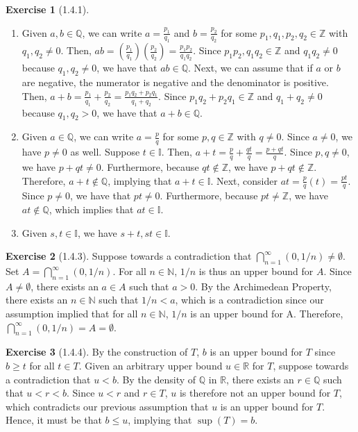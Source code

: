 \documentclass{amsart}
\theoremstyle{definition}
\newtheorem{exercise}{Exercise}
\newcommand{\N}{\mathbb{N}}
\newcommand{\Z}{\mathbb{Z}}
\newcommand{\Q}{\mathbb{Q}}
\newcommand{\I}{\mathbb{I}}
\newcommand{\R}{\mathbb{R}}
\begin{document}
\begin{exercise}[1.4.1]
  \begin{enumerate}[label={(\alph*)}]
    \item Given $a, b \in \Q$, we can write $a = \frac{p_1}{q_1}$ and $b =
      \frac{p_2}{q_2}$ for some $p_1, q_1, p_2, q_2 \in \Z$ with $q_1, q_2 \neq
      0$.  Then, $ab = (\frac{p_1}{q_1}) (\frac{p_2}{q_2}) = \frac{p_1 p_2}{q_1
      q_2}$. Since $p_1 p_2, q_1 q_2 \in \Z$ and $q_1 q_2 \neq 0$ because $q_1,
      q_2 \neq 0$, we have that $ab \in \Q$. Next, we can assume that if $a$ or
      $b$ are negative, the numerator is negative and the denominator is
      positive. Then, $a + b = \frac{p_1}{q_1} + \frac{p_2}{q_2} = \frac{p_1 q_2
      + p_2 q_1}{q_1 + q_2}$.  Since $p_1 q_2 + p_2 q_1 \in \Z$ and $q_1 + q_2
      \neq 0$ because $q_1, q_2 > 0$, we have that $a + b \in \Q$.
    \item Given $a \in \Q$, we can write $a = \frac{p}{q}$ for some $p, q \in
      \Z$ with $q \neq 0$. Since $a \neq 0$, we have $p \neq 0$ as well.
      Suppose $t \in \I$. Then, $a + t = \frac{p}{q} + \frac{qt}{q} = \frac{p +
      qt}{q}$. Since $p, q \neq 0$, we have $p + qt \neq 0$. Furthermore,
      because $qt \notin \Z$, we have $p + qt \notin \Z$. Therefore, $a + t
      \notin \Q$, implying that $a + t \in \I$.  Next, consider $at =
      \frac{p}{q} (t) = \frac{pt}{q}$. Since $p \neq 0$, we have that $pt \neq
      0$. Furthermore, because $pt \neq \Z$, we have $at \notin \Q$, which
      implies that $at \in \I$.
    \item Given $s, t \in \I$, we have $s + t, st \in \I$.
  \end{enumerate}
\end{exercise}


\begin{exercise}[1.4.3]
  Suppose towards a contradiction that $\bigcap_{n=1}^{\infty} (0, 1/n) \neq
  \emptyset$. Set $A = \bigcap_{n=1}^{\infty} (0, 1/n)$. For all $n \in \N$,
  $1/n$ is thus an upper bound for $A$. Since $A \neq \emptyset$, there exists
  an $a \in A$ such that $a > 0$. By the Archimedean Property, there exists an
  $n \in \N$ such that $1/n < a$, which is a contradiction since our assumption
  implied that for all $n \in \N$, $1/n$ is an upper bound for A. Therefore,
  $\bigcap_{n=1}^{\infty} (0, 1/n) = A = \emptyset$.
\end{exercise}

\begin{exercise}[1.4.4]
  By the construction of $T$, $b$ is an upper bound for $T$ since $b \ge t$ for
  all $t \in T$. Given an arbitrary upper bound $u \in \R$ for $T$, suppose
  towards a contradiction that $u < b$. By the density of $\Q$ in $\R$, there
  exists an $r \in \Q$ such that $u < r < b$. Since $u < r$ and $r \in T$, $u$
  is therefore not an upper bound for $T$, which contradicts our previous
  assumption that $u$ is an upper bound for $T$. Hence, it must be that $b \le
  u$, implying that $\sup(T) = b$.
\end{exercise}
\end{document}
